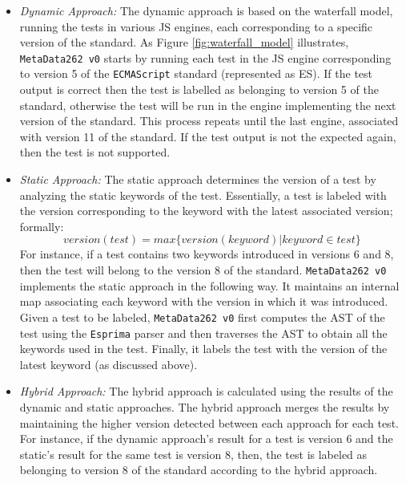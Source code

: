 \documentclass[runningheads]{llncs}
\begin{document}
\begin{itemize}
  \item \emph{Dynamic Approach:}
The dynamic approach is based on the waterfall model, running the tests in various JS engines, each corresponding to a specific version of the standard. As Figure \ref{fig:waterfall_model} illustrates, \texttt{MetaData262 v0} starts by running each test in the JS engine corresponding to version 5 of the \texttt{ECMAScript} standard (represented as ES). If the test output is correct then the test is labelled as belonging to version 5 of the standard, otherwise the test will be run in the engine implementing the next version of the standard. This process repeats until the last engine, associated with version 11 of the standard. If the test output is not the expected again, then the test is not supported.
%
  \item \emph{Static Approach:}
The static approach determines the version of a test by analyzing the static keywords of the test. Essentially, a test is labeled with the version corresponding to the keyword with the latest associated version; formally:
\[version(test) = max \{ version(keyword) | keyword \in test \} \]
For instance, if a test contains two keywords introduced in versions 6 and 8, then the test will belong to the version 8 of the standard. \texttt{MetaData262 v0} implements the static approach in the following way. It maintains an internal map associating each keyword with the version in which it was introduced. Given a test to be labeled, \texttt{MetaData262 v0} first computes the AST of the test using the \texttt{Esprima} parser and then traverses the AST to obtain all the keywords used in the test. Finally, it labels the test with the version of the latest keyword (as discussed above). 
%
  \item \emph{Hybrid Approach:}
The hybrid approach is calculated using the results of the dynamic and static approaches. The hybrid approach merges the results by maintaining the higher version detected between each approach for each test. For instance, if the dynamic approach's result for a test is version 6 and the static's result for the same test is version 8, then, the test is labeled as belonging to version 8 of the standard according to the hybrid approach.
\end{itemize}
\end{document}
